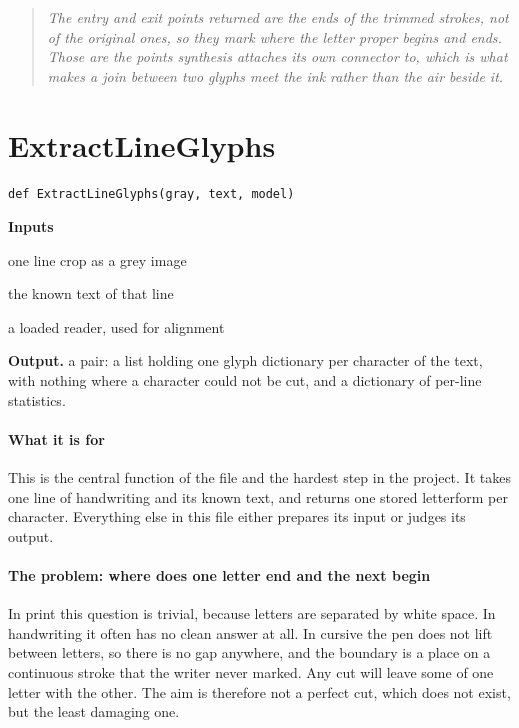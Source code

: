 \begin{quote}\small\itshape The entry and exit points returned are the ends of the trimmed strokes, not of the original ones, so they mark where the letter proper begins and ends. Those are the points synthesis attaches its own connector to, which is what makes a join between two glyphs meet the ink rather than the air beside it.\end{quote}

\section{ExtractLineGlyphs}
\begin{lstlisting}[style=sig]
def ExtractLineGlyphs(gray, text, model)
\end{lstlisting}

\noindent\textbf{Inputs}
\begin{description}[leftmargin=2.2em,style=nextline,font=\normalfont\ttfamily]\setlength\itemsep{1pt}
  \item[{gray}] \normalfont one line crop as a grey image
  \item[{text}] \normalfont the known text of that line
  \item[{model}] \normalfont a loaded reader, used for alignment
\end{description}

\noindent\textbf{Output.} a pair: a list holding one glyph dictionary per character of the text, with nothing where a character could not be cut, and a dictionary of per-line statistics.


\paragraph{What it is for}
This is the central function of the file and the hardest step in the project. It takes one line of handwriting and its known text, and returns one stored letterform per character. Everything else in this file either prepares its input or judges its output.


\paragraph{The problem: where does one letter end and the next begin}
In print this question is trivial, because letters are separated by white space. In handwriting it often has no clean answer at all. In cursive the pen does not lift between letters, so there is no gap anywhere, and the boundary is a place on a continuous stroke that the writer never marked. Any cut will leave some of one letter with the other. The aim is therefore not a perfect cut, which does not exist, but the least damaging one.



